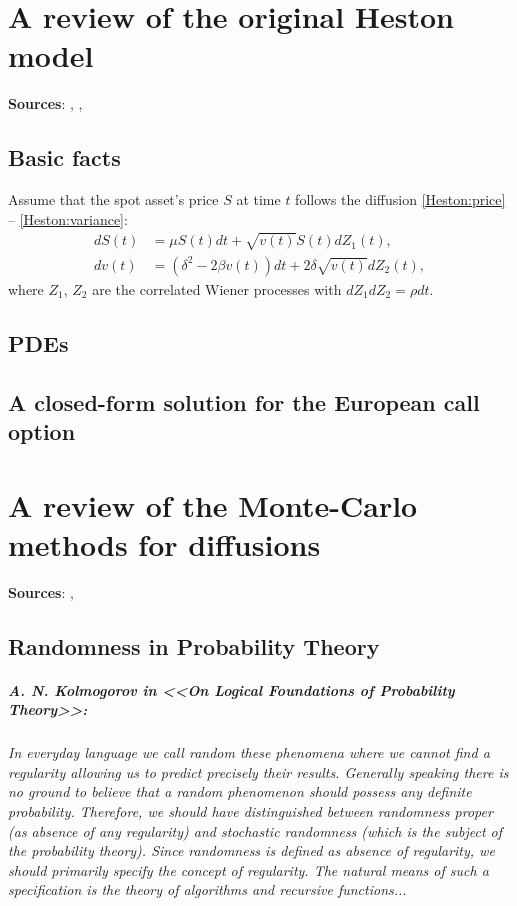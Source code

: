 \chapter{A review of the original Heston model}
    \textbf{Sources}: \cite{Heston1993}, \cite{Gatheral2012}, \cite{Zhitlukhin2022}
    \section{Basic facts}
        Assume that the spot asset's price $S$ at time $t$ follows the diffusion \eqref{Heston:price} -- \eqref{Heston:variance}:
        \begin{align}
            dS(t) & = \mu S(t)dt + \sqrt{v(t)} S(t) dZ_1(t), \label{Heston:price}\\
            dv(t) & = \left(\delta^2 - 2\beta v(t)\right) dt + 2\delta \sqrt{v(t)} dZ_2(t), \label{Heston:variance}
        \end{align}
        where $Z_1$, $Z_2$ are the correlated Wiener processes with $dZ_1dZ_2 = \rho dt$.
    \section{PDEs}
    \section{A closed-form solution for the European call option}
\chapter{A review of the Monte-Carlo methods for diffusions}
    \textbf{Sources}: \cite{Kolmogorov1983}, \cite{Zhitlukhin2022}
    \section{Randomness in Probability Theory}
        \paragraph{A. N. Kolmogorov in <<On Logical Foundations of Probability Theory>>: }
        \textit {In everyday language we call random these phenomena where we cannot find a regularity allowing us to predict precisely their results. Generally speaking there is no ground to believe that a random phenomenon should possess any definite probability. Therefore, we should have distinguished between randomness proper
        (as absence of any regularity) and stochastic randomness (which is the subject of the probability theory).
        Since randomness is defined as absence of regularity, we should
        primarily specify the concept of regularity. The natural means of such a specification is the theory of algorithms and recursive functions...}

